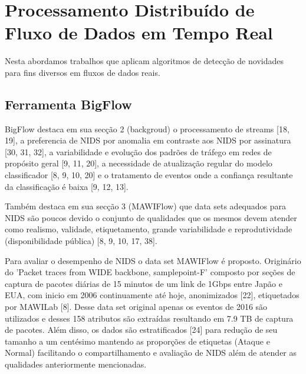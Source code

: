 




\section{Processamento Distribuído de Fluxo de Dados em Tempo Real}


Nesta \Section abordamos trabalhos que aplicam algoritmos de detecção de
novidades para fins diversos em fluxos de dados reais.

\subsection{Ferramenta BigFlow}


\cite{mawiSamplepointF,Fontugne2010}
BigFlow destaca em sua secção 2 (backgroud) o processamento de streams [18, 19],
a preferencia de NIDS por anomalia em contraste aos NIDS por assinatura [30, 31, 32],
a variabilidade e evolução dos padrões de tráfego em redes de propósito geral [9, 11, 20],
a necessidade de atualização regular do modelo classificador [8, 9, 10, 20] e
o tratamento de eventos onde a confiança resultante da classificação é baixa [9, 12, 13].

Também destaca em sua secção 3 (MAWIFlow) 
que data sets adequados para NIDS são poucos devido o conjunto de qualidades que os mesmos
devem atender como realismo, validade, etiquetamento, grande variabilidade
e reprodutividade (disponibilidade pública) [8, 9, 10, 17, 38].


Para avaliar o desempenho de NIDS o data set MAWIFlow é proposto. Originário do 
'Packet traces from WIDE backbone, samplepoint-F' composto por seções de captura de pacotes
diárias de 15 minutos de um link de 1Gbps entre Japão e EUA, com inicio em 2006 continuamente até hoje,
anonimizados [22], etiquetados por MAWILab [8].
Desse data set original apenas os eventos de 2016 são utilizados e desses 158 atributos são extraídas
resultando em 7.9 TB de captura de pacotes. Além disso, os dados são estratificados [24] para redução
de seu tamanho a um centésimo mantendo as proporções de etiquetas (Ataque e Normal)
facilitando o compartilhamento e avaliação de NIDS além de atender as qualidades anteriormente mencionadas.

